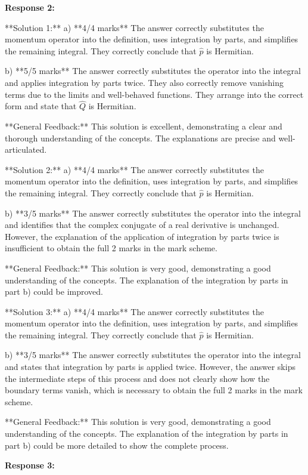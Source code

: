 \documentclass[a4paper,11pt]{article}
\begin{document}
\textbf{Response 2:}

**Solution 1:**
a) **4/4 marks**
The answer correctly substitutes the momentum operator into the definition, uses integration by parts, and simplifies the remaining integral. They correctly conclude that \(\hat{p}\) is Hermitian.

b) **5/5 marks**
The answer correctly substitutes the operator into the integral and applies integration by parts twice. They also correctly remove vanishing terms due to the limits and well-behaved functions. They arrange into the correct form and state that \(\hat{Q}\) is Hermitian.

**General Feedback:** This solution is excellent, demonstrating a clear and thorough understanding of the concepts. The explanations are precise and well-articulated.

**Solution 2:**
a) **4/4 marks**
The answer correctly substitutes the momentum operator into the definition, uses integration by parts, and simplifies the remaining integral. They correctly conclude that \(\hat{p}\) is Hermitian.

b) **3/5 marks**
The answer correctly substitutes the operator into the integral and identifies that the complex conjugate of a real derivative is unchanged. However, the explanation of the application of integration by parts twice is insufficient to obtain the full 2 marks in the mark scheme.

**General Feedback:** This solution is very good, demonstrating a good understanding of the concepts. The explanation of the integration by parts in part b) could be improved.

**Solution 3:**
a) **4/4 marks**
The answer correctly substitutes the momentum operator into the definition, uses integration by parts, and simplifies the remaining integral. They correctly conclude that \(\hat{p}\) is Hermitian.

b) **3/5 marks**
The answer correctly substitutes the operator into the integral and states that integration by parts is applied twice. However, the answer skips the intermediate steps of this process and does not clearly show how the boundary terms vanish, which is necessary to obtain the full 2 marks in the mark scheme.

**General Feedback:** This solution is very good, demonstrating a good understanding of the concepts. The explanation of the integration by parts in part b) could be more detailed to show the complete process.

\textbf{Response 3:}
\end{document}
